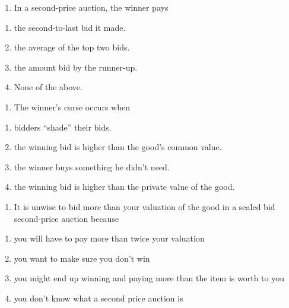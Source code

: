 \documentclass[11pt,]{article}
\providecommand{\tightlist}{%
  \setlength{\itemsep}{0pt}\setlength{\parskip}{0pt}}
\begin{document}
\begin{enumerate}
\def\labelenumi{\arabic{enumi})}
\setcounter{enumi}{20}
\tightlist
\item
  In a second-price auction, the winner pays
\end{enumerate}

\begin{enumerate}
\def\labelenumi{\Alph{enumi})}
\tightlist
\item
  the second-to-last bid it made.
\item
  the average of the top two bids.
\item
  the amount bid by the runner-up.
\item
  None of the above.
\end{enumerate}

\begin{enumerate}
\def\labelenumi{\arabic{enumi})}
\setcounter{enumi}{21}
\tightlist
\item
  The winner's curse occurs when
\end{enumerate}

\begin{enumerate}
\def\labelenumi{\Alph{enumi})}
\tightlist
\item
  bidders ``shade'' their bids.
\item
  the winning bid is higher than the good's common value.
\item
  the winner buys something he didn't need.
\item
  the winning bid is higher than the private value of the good.
\end{enumerate}

\begin{enumerate}
\def\labelenumi{\arabic{enumi})}
\setcounter{enumi}{22}
\tightlist
\item
  It is unwise to bid more than your valuation of the good in a sealed
  bid second-price auction because
\end{enumerate}

\begin{enumerate}
\def\labelenumi{\Alph{enumi})}
\tightlist
\item
  you will have to pay more than twice your valuation
\item
  you want to make sure you don't win
\item
  you might end up winning and paying more than the item is worth to you
\item
  you don't know what a second price auction is
\end{enumerate}
\end{document}
